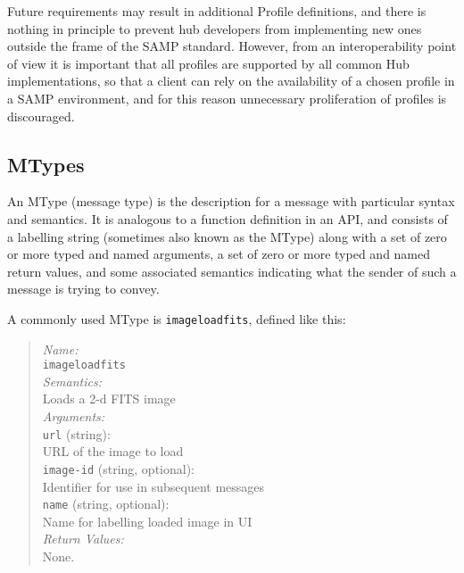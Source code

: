 \documentclass[5p]{elsarticle}
\begin{document}
Future requirements may result in additional Profile definitions,
and there is nothing in principle to prevent hub developers
from implementing new ones outside the frame of the SAMP standard.
However, from an interoperability point of view it is important
that all profiles are supported by all common Hub implementations,
so that a client can rely on the availability of a chosen profile
in a SAMP environment, and for this reason unnecessary proliferation
of profiles is discouraged.



\subsection{MTypes} \label{sec:mtypes}

An MType (message type) is the description for a message with particular
syntax and semantics.
It is analogous to a function definition in an API,
and consists of a labelling string (sometimes also known as the MType)
along with
a set of zero or more typed and named arguments,
a set of zero or more typed and named return values,
and some associated semantics indicating what the sender of such a
message is trying to convey.

A commonly used MType is {\tt image{\kdot}load{\kdot}fits},
defined like this:
\begin{quote}
  {\em Name:\/} \\
    \hspace*{1em} {\tt image{\kdot}load{\kdot}fits} \\
  {\em Semantics:\/} \\
    \hspace*{1em} Loads a 2-d FITS image \\
  {\em Arguments:\/} \\
    \hspace*{1em} {\tt url} (string): \\
    \hspace*{2em} URL of the image to load \\
    \hspace*{1em} {\tt image-id} (string, optional): \\
    \hspace*{2em} Identifier for use in subsequent messages \\
    \hspace*{1em} {\tt name} (string, optional): \\
    \hspace*{2em} Name for labelling loaded image in UI \\
  {\em Return Values:\/} \\
    \hspace*{1em} None.
\end{quote}
\end{document}
